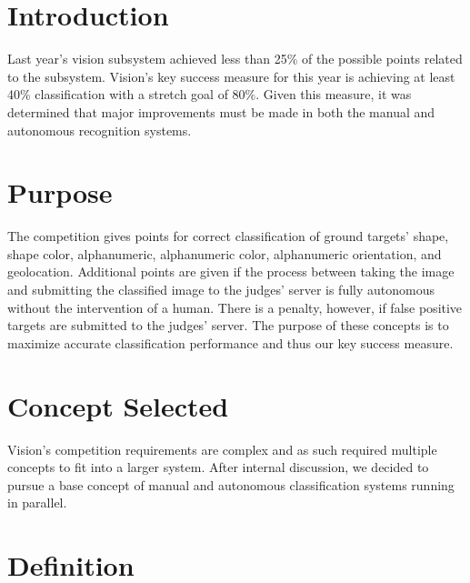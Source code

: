\documentclass[]{auvsi_doc}
\begin{document}
\begin{AUVSITitlePage}
\begin{artifacttable}
\end{artifacttable}
\end{AUVSITitlePage}

\section{Introduction}

Last year's vision subsystem achieved less than 25\% of the possible points related to the subsystem. 
Vision's key success measure for this year is achieving at least 40\% classification with a stretch 
goal of 80\%. Given this measure, it was determined that major improvements must be made in both 
the manual and autonomous recognition systems.

\section{Purpose}

The competition gives points for correct classification of ground targets' shape, shape color,
alphanumeric, alphanumeric color, alphanumeric orientation, and geolocation. Additional points
are given if the process between taking the image and submitting the classified image to the
judges' server is fully autonomous without the intervention of a human. There is a penalty, 
however, if false positive targets are submitted to the judges' server. The purpose of these
concepts is to maximize accurate classification performance and thus our key success measure.

\section{Concept Selected}

Vision's competition requirements are complex and as such required multiple concepts to 
fit into a larger system. After internal discussion, we decided to pursue a base concept 
of manual and autonomous classification systems running in parallel.

\section{Definition}
\end{document}
